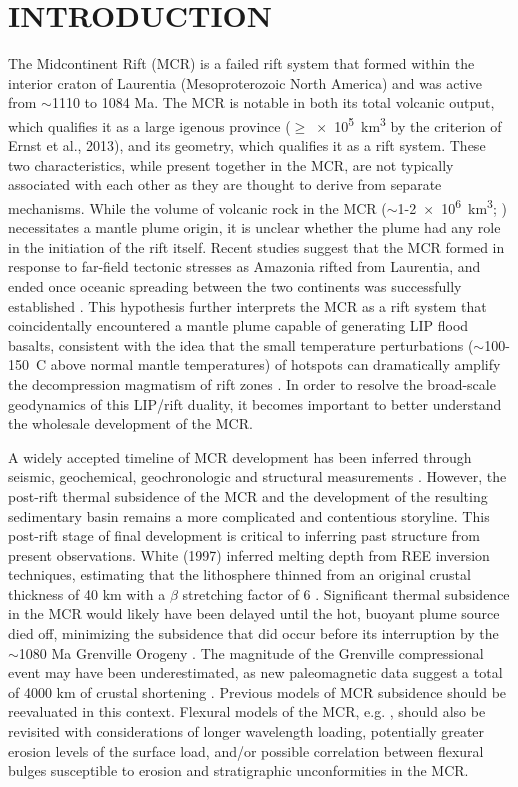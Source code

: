 \documentclass[11pt,letterpaper]{article}
\begin{document}
\section*{INTRODUCTION}
The Midcontinent Rift (MCR) is a failed rift system that formed within the interior craton of Laurentia (Mesoproterozoic North America) and was active from $\sim$1110 to 1084 Ma. The MCR is notable in both its total volcanic output, which qualifies it as a large igenous province ($\geq$\SI{e5}{km^3} by the criterion of Ernst et al., 2013\nocite{Ernst2013b}), and its geometry, which qualifies it as a rift system. These two characteristics, while present together in the MCR, are not typically associated with each other as they are thought to derive from separate mechanisms. While the volume of volcanic rock in the MCR ($\sim$1-\SI{2e6}{km^3}; \cite{Hutchinson1990a}) necessitates a mantle plume origin, it is unclear whether the plume had any role in the initiation of the rift itself. Recent studies suggest that the MCR formed in response to far-field tectonic stresses as Amazonia rifted from Laurentia, and ended once oceanic spreading between the two continents was successfully established \cite{Stein2014a}. This hypothesis further interprets the MCR as a rift system that coincidentally encountered a mantle plume capable of generating LIP flood basalts, consistent with the idea that the small temperature perturbations ($\sim$100-150\textdegree\ C above normal mantle temperatures) of hotspots can dramatically amplify the decompression magmatism of rift zones \cite{White1989a}. In order to resolve the broad-scale geodynamics of this LIP/rift duality, it becomes important to better understand the wholesale development of the MCR.\par{}
A widely accepted timeline of MCR development has been inferred through seismic, geochemical, geochronologic and structural measurements \cite{Cannon1989a,Cannon1992b,White1997a,Stein2015a}. However, the post-rift thermal subsidence of the MCR and the development of the resulting sedimentary basin remains a more complicated and contentious storyline. This post-rift stage of final development is critical to inferring past structure from present observations. White (1997)\nocite{White1997a} inferred melting depth from REE inversion techniques, estimating that the lithosphere thinned from an original crustal thickness of 40 km with a $\beta$ stretching factor of 6 \cite{McKenzie1978a}. Significant thermal subsidence in the MCR would likely have been delayed until the hot, buoyant plume source died off, minimizing the subsidence that did occur before its interruption by the $\sim$1080 Ma Grenville Orogeny \cite{White1997a}. The magnitude of the Grenville compressional event may have been underestimated, as new paleomagnetic data suggest a total of 4000 km of crustal shortening \cite{Halls2015a}. Previous models of MCR subsidence should be reevaluated in this context. Flexural models of the MCR, e.g. \cite{Nyquist1988a}, should also be revisited with considerations of longer wavelength loading, potentially greater erosion levels of the surface load, and/or possible correlation between flexural bulges susceptible to erosion and stratigraphic unconformities in the MCR.\par{}
\end{document}
